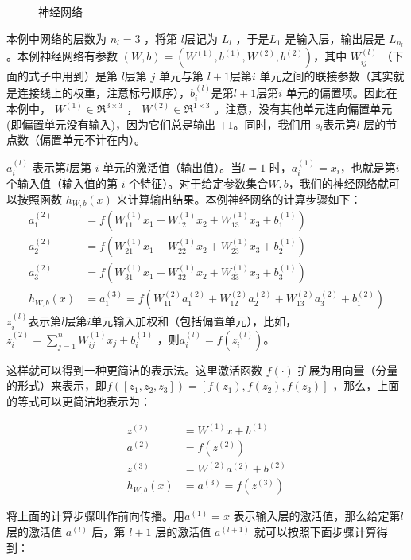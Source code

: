 \begin{figure}
  \centering
  
  \caption{神经网络}
  \label{fig:network}  
\end{figure}

本例中网络的层数为 $ n_l=3$ ，将第 $ l $层记为 $ L_l$ ，于是$  L_1$ 是输入层，输出层是 $ L_{n_l} $。本例神经网络有参数 $ (W,b) = (W^{(1)}, b^{(1)}, W^{(2)}, b^{(2)}) $，其中 $ W^{(l)}_{ij}$ （下面的式子中用到）是第 $ l $层第 $ j$ 单元与第 $ l+1 $层第$  i$ 单元之间的联接参数（其实就是连接线上的权重，注意标号顺序），$ b^{(l)}_i $是第$  l+1 $层第$  i$ 单元的偏置项。因此在本例中， $ W^{(1)} \in \Re^{3\times 3}$ ， $ W^{(2)} \in \Re^{1\times 3}$ 。注意，没有其他单元连向偏置单元(即偏置单元没有输入)，因为它们总是输出 $ +1$。同时，我们用 $ s_l $表示第$  l$ 层的节点数（偏置单元不计在内）。

$ a^{(l)}_i$ 表示第$  l $层第 $ i$ 单元的激活值（输出值）。当$  l=1$ 时，$  a^{(1)}_i = x_i $，也就是第$  i $个输入值（输入值的第 $ i$ 个特征）。对于给定参数集合$  W,b $，我们的神经网络就可以按照函数 $ h_{W,b}(x)$ 来计算输出结果。本例神经网络的计算步骤如下：
\begin{align}
a_1^{(2)} &= f(W_{11}^{(1)}x_1 + W_{12}^{(1)} x_2 + W_{13}^{(1)} x_3 + b_1^{(1)})  \\
a_2^{(2)} &= f(W_{21}^{(1)}x_1 + W_{22}^{(1)} x_2 + W_{23}^{(1)} x_3 + b_2^{(1)})  \\
a_3^{(2)} &= f(W_{31}^{(1)}x_1 + W_{32}^{(1)} x_2 + W_{33}^{(1)} x_3 + b_3^{(1)})  \\
h_{W,b}(x) &= a_1^{(3)} =  f(W_{11}^{(2)}a_1^{(2)} + W_{12}^{(2)} a_2^{(2)} + W_{13}^{(2)} a_3^{(2)} + b_1^{(2)}) 
\end{align}
 $ z^{(l)}_i $表示第$ l $层第$  i$单元输入加权和（包括偏置单元），比如，$  z_i^{(2)} = \sum_{j=1}^n W^{(1)}_{ij} x_j + b^{(1)}_i$ ，则$  a^{(l)}_i = f(z^{(l)}_i) $。

这样就可以得到一种更简洁的表示法。这里激活函数 $ f(\cdot)$ 扩展为用向量（分量的形式）来表示，即$  f([z_1, z_2, z_3]) = [f(z_1), f(z_2), f(z_3)]$ ，那么，上面的等式可以更简洁地表示为：

\begin{align}
z^{(2)} &= W^{(1)} x + b^{(1)} \\
a^{(2)} &= f(z^{(2)}) \\
z^{(3)} &= W^{(2)} a^{(2)} + b^{(2)} \\
h_{W,b}(x) &= a^{(3)} = f(z^{(3)})
\end{align}

将上面的计算步骤叫作前向传播。用$  a^{(1)} = x$ 表示输入层的激活值，那么给定第$  l$ 层的激活值 $ a^{(l)}$ 后，第 $ l+1$ 层的激活值 $ a^{(l+1)}$ 就可以按照下面步骤计算得到：

